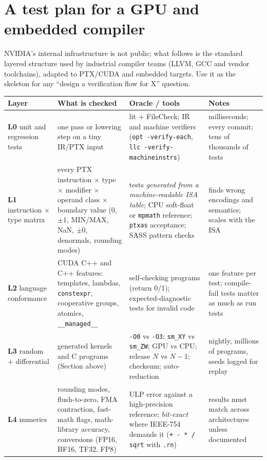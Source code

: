 \documentclass[10pt,a4paper,openany,oneside]{report}
\newcommand{\prio}[1]{\texorpdfstring{\ifcase#1\or{\color{gold}\ding{72}}\or{\color{gold}\ding{72}\ding{72}}\or{\color{gold}\ding{72}\ding{72}\ding{72}}\fi}{}}
\begin{document}
\section{A test plan for a GPU and embedded compiler \prio{3}}
\label{sec:plan}
NVIDIA's internal infrastructure is not public; what follows is the standard layered structure used by industrial compiler teams (LLVM, GCC and vendor toolchains), adapted to PTX/CUDA and embedded targets. Use it as the skeleton for any ``design a verification flow for X'' question.
\begin{center}\small
\begin{xltabular}{\textwidth}{@{}L{2.9cm}L{4.5cm}L{4.1cm}Y@{}}
\toprule
\textbf{Layer} & \textbf{What is checked} & \textbf{Oracle / tools} & \textbf{Notes}\\
\midrule\endhead
\textbf{L0} unit and regression tests & one pass or lowering step on a tiny IR/PTX input & lit + FileCheck; IR and machine verifiers (\texttt{opt -verify-each}, \texttt{llc -verify-machineinstrs}) & milliseconds; every commit; tens of thousands of tests\\
\textbf{L1} instruction $\times$ type matrix & every PTX instruction $\times$ type $\times$ modifier $\times$ operand class $\times$ boundary value (0, $\pm1$, MIN/MAX, NaN, $\pm0$, denormals, rounding modes) & tests \emph{generated from a machine-readable ISA table}; CPU soft-float or \texttt{mpmath} reference; \texttt{ptxas} acceptance; SASS pattern checks & finds wrong encodings and semantics; scales with the ISA\\
\textbf{L2} language conformance & CUDA C++ and C++ features: templates, lambdas, \texttt{constexpr}, cooperative groups, atomics, \texttt{\_\_managed\_\_} & self-checking programs (return 0/1); expected-diagnostic tests for invalid code & one feature per test; compile-fail tests matter as much as run tests\\
\textbf{L3} random + differential & generated kernels and C programs (Section above) & \texttt{-O0} vs \texttt{-O3}; \texttt{sm\_XY} vs \texttt{sm\_ZW}; GPU vs CPU; release $N$ vs $N{-}1$; checksum; auto-reduction & nightly, millions of programs, seeds logged for replay\\
\textbf{L4} numerics & rounding modes, flush-to-zero, FMA contraction, fast-math flags, math-library accuracy, conversions (FP16, BF16, TF32, FP8) & ULP error against a high-precision reference; \emph{bit-exact} where IEEE-754 demands it (\texttt{+ - * / sqrt} with \texttt{.rn}) & results must match across architectures unless documented\\

\end{xltabular}
\end{center}
\end{document}

